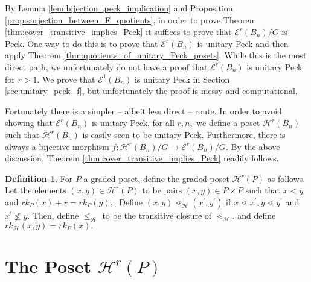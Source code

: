 \documentclass[10 pt]{amsart}
\theoremstyle{plain}
\theoremstyle{definition}
\newtheorem{defn}[thm]{Definition}
\theoremstyle{remark}
\numberwithin{equation}{section}
\begin{document}
By Lemma \ref{lem:bijection_peck_implication} and Proposition \ref{prop:surjection_between_F_quotients}, in order to prove Theorem \ref{thm:cover_transitive_implies_Peck} it suffices to prove that $\mathcal E^r(B_n)/G$ is Peck.  One way to do this is to prove that $\mathcal E^r(B_n)$ is unitary Peck and then apply Theorem \ref{thm:quotients_of_unitary_Peck_posets}.  While this is the most direct path, we unfortunately do not have a proof that $\mathcal E^r(B_n)$ is unitary Peck for $r>1$.  We prove that $\mathcal E^1(B_n)$ is unitary Peck in Section \ref{sec:unitary_peck_f}, but unfortunately the proof is messy and computational.



Fortunately there is a simpler -- albeit less direct -- route.  In order to avoid showing that $\mathcal E^r(B_n)$ is unitary Peck, for all $r,n,$ we define a poset $\mathcal{H}^r(B_n)$ such that $\mathcal{H}^r(B_n)$ is easily seen to be unitary Peck. Furthermore, there is always a bijective morphism $f\colon \mathcal{H}^r(B_n)/G\rightarrow \mathcal E^r(B_n)/G$.  By the above discussion, Theorem \ref{thm:cover_transitive_implies_Peck} readily follows.

\begin{defn}
\label{defn:h_map}
For $P$ a graded poset, define the graded poset $\mathcal H^r(P)$ as follows. Let the elements $(x, y) \in \mathcal H^r(P)$ to be pairs $(x,y) \in P\times P$ such that $x <y$ and $rk_P(x) + r = rk_P(y),$.  Define $(x, y) \lessdot_{\mathcal H} (x^\prime, y^\prime)$ if $x \lessdot x^\prime,y\lessdot y^\prime$ and $x^\prime \not \leq y.$ Then, define $\leq_{\mathcal H}$ to be the transitive closure of $\lessdot_{\mathcal H}.$ and define $rk_{\mathcal H}(x, y) = rk_P(x).$

\end{defn}






\section{The Poset $\mathcal{H}^r(P)$}
\end{document}
